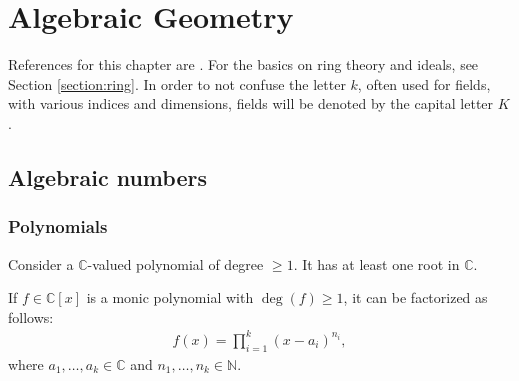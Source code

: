 \chapter{Algebraic Geometry}\label{chapter:alggeom}

    References for this chapter are \cite{gathmann, redbook}. For the basics on ring theory and ideals, see Section \ref{section:ring}. In order to not confuse the letter $k$, often used for fields, with various indices and dimensions, fields will be denoted by the capital letter $K$.

\section{Algebraic numbers}
\subsection{Polynomials}



    \begin{theorem}\label{alggeom:fundamental_theorem_of_algebra}
        Consider a $\mathbb{C}$-valued polynomial of degree $\geq 1$. It has at least one root in $\mathbb{C}$.
    \end{theorem}
    \begin{result}
        If $f\in \mathbb{C}[x]$ is a monic polynomial with $\deg(f)\geq1$, it can be factorized as follows:
        \begin{gather*}
            f(x) = \prod_{i=1}^k(x-a_i)^{n_i},
        \end{gather*}
        where $a_1,\ldots, a_k\in\mathbb{C}$ and $n_1,\ldots,n_k\in\mathbb{N}$.
    \end{result}

